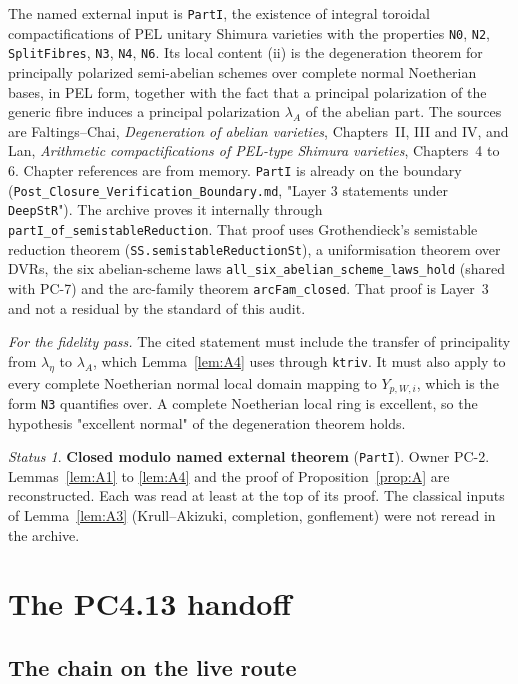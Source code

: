 \documentclass[11pt]{article}
\newcommand{\lean}[1]{\nolinkurl{#1}}
\newcommand{\Lpath}[1]{\nolinkurl{#1}}
\newcommand{\PC}[1]{PC-#1}
\theoremstyle{remark}
\newtheorem*{status}{Status}
\begin{document}
The named external input is \lean{PartI}, the existence of integral toroidal compactifications of PEL unitary Shimura varieties with the properties \lean{N0}, \lean{N2}, \lean{SplitFibres}, \lean{N3}, \lean{N4}, \lean{N6}. Its local content (ii) is the degeneration theorem for principally polarized semi-abelian schemes over complete normal Noetherian bases, in PEL form, together with the fact that a principal polarization of the generic fibre induces a principal polarization $\lambda_A$ of the abelian part. The sources are Faltings--Chai, \emph{Degeneration of abelian varieties}, Chapters~II, III and IV, and Lan, \emph{Arithmetic compactifications of PEL-type Shimura varieties}, Chapters~4 to 6. Chapter references are from memory. \lean{PartI} is already on the boundary (\Lpath{Post_Closure_Verification_Boundary.md}, "Layer 3 statements under \lean{DeepStR}"). The archive proves it internally through \lean{partI_of_semistableReduction}. That proof uses Grothendieck's semistable reduction theorem (\lean{SS.semistableReductionSt}), a uniformisation theorem over DVRs, the six abelian-scheme laws \lean{all_six_abelian_scheme_laws_hold} (shared with \PC{7}) and the arc-family theorem \lean{arcFam_closed}. That proof is Layer~3 and not a residual by the standard of this audit.

\emph{For the fidelity pass.} The cited statement must include the transfer of principality from $\lambda_\eta$ to $\lambda_A$, which Lemma~\ref{lem:A4} uses through \lean{ktriv}. It must also apply to every complete Noetherian normal local domain mapping to $Y_{p,W,i}$, which is the form \lean{N3} quantifies over. A complete Noetherian local ring is excellent, so the hypothesis "excellent normal" of the degeneration theorem holds.

\begin{status}
\textbf{Closed modulo named external theorem} (\lean{PartI}). Owner \PC{2}. Lemmas~\ref{lem:A1} to \ref{lem:A4} and the proof of Proposition~\ref{prop:A} are reconstructed. Each was read at least at the top of its proof. The classical inputs of Lemma~\ref{lem:A3} (Krull--Akizuki, completion, gonflement) were not reread in the archive.
\end{status}

\section{The PC4.13 handoff}\label{sec:B}

\subsection{The chain on the live route}
\end{document}
